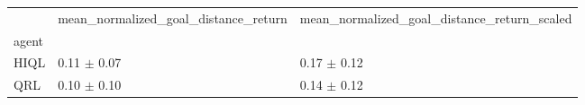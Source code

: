 \begin{tabular}{lll}
\toprule
 & mean_normalized_goal_distance_return & mean_normalized_goal_distance_return_scaled \\
agent &  &  \\
\midrule
HIQL & 0.11 $\pm$ 0.07 & 0.17 $\pm$ 0.12 \\
QRL & 0.10 $\pm$ 0.10 & 0.14 $\pm$ 0.12 \\
\bottomrule
\end{tabular}
